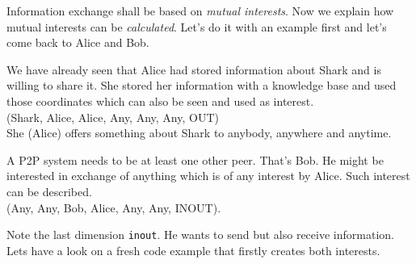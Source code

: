 Information exchange shall be based on {\it mutual interests}. Now we explain how mutual interests can be {\it calculated}. Let's do it with an example first and let's come back to Alice and Bob.

We have already seen that Alice had stored information about Shark and is willing to share it. She stored her information with a knowledge base and used those coordinates which can also be seen and used as interest.\\
(Shark, Alice, Alice, Any, Any, Any, OUT)\\
She (Alice) offers something about Shark to anybody, anywhere and anytime.

A P2P system needs to be at least one other peer. That's Bob. He might be interested in exchange of anything which is of any interest by Alice. Such interest can be described.\\
(Any, Any, Bob, Alice, Any, Any, INOUT).

Note the last dimension {\tt inout}. He wants to send but also receive  information. Lets have a look on a fresh code example that firstly creates both interests.


